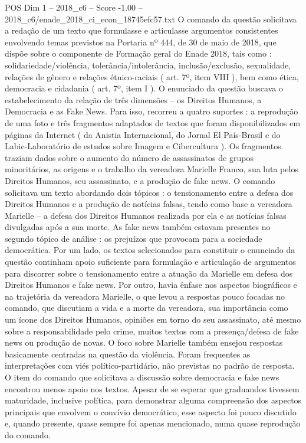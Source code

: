 \begin{textsample}{POS Dim 1 – 2018\_c6 – Score -1.00 – 2018\_c6/enade\_2018\_ci\_econ\_18745efc57.txt}
O comando da questão solicitava a redação de um texto que formulasse e articulasse argumentos consistentes envolvendo temas previstos na Portaria nº 444, de 30 de maio de 2018, que dispõe sobre o componente de Formação geral do Enade 2018, tais como : solidariedade/violência, tolerância/intolerância, inclusão/exclusão, sexualidade, relações de gênero e relações étnico-raciais ( art. 7º, item VIII ), bem como ética, democracia e cidadania ( art. 7º, item I ).
O enunciado da questão buscava o estabelecimento da relação de três dimensões – os Direitos Humanos, a Democracia e as Fake News.
Para isso, recorreu a quatro suportes : a reprodução de uma foto e três fragmentos adaptados de textos que foram disponibilizados em páginas da Internet ( da Anistia Internacional, do Jornal El País-Brasil e do Labic-Laboratório de estudos sobre Imagem e Cibercultura ).
Os fragmentos traziam dados sobre o aumento do número de assassinatos de grupos minoritários, as origens e o trabalho da vereadora Marielle Franco, sua luta pelos Direitos Humanos, seu assassinato, e a produção de fake news.
O comando solicitava um texto abordando dois tópicos : o tensionamento entre a defesa dos Direitos Humanos e a produção de notícias falsas, tendo como base a vereadora Marielle – a defesa dos Direitos Humanos realizada por ela e as notícias falsas divulgadas após a sua morte.
As fake news também estavam presentes no segundo tópico de análise : os prejuízos que provocam para a sociedade democrática.
Por um lado, os textos selecionados para constituir o enunciado da questão continham apoio suficiente para formulação e articulação de argumentos para discorrer sobre o tensionamento entre a atuação da Marielle em defesa dos Direitos Humanos e fake news.
Por outro, havia ênfase nos aspectos biográficos e na trajetória da vereadora Marielle, o que levou a respostas pouco focadas no comando, que discutiam a vida e a morte da vereadora, sua importância como um ícone dos Direitos Humanos, opiniões em torno do seu assassinato, até mesmo sobre a responsabilidade pelo crime, muitos textos com a presença/defesa de fake news ou produção de novas.
O foco sobre Marielle também ensejou respostas basicamente centradas na questão da violência.
Foram frequentes as interpretações com viés político-partidário, não previstas no padrão de resposta.
O item do comando que solicitava a discussão sobre democracia e fake news encontrou menos apoio nos textos.
Apesar de se esperar que graduandos tivessem maturidade, inclusive política, para demonstrar alguma compreensão dos aspectos principais que envolvem o convívio democrático, esse aspecto foi pouco discutido e, quando presente, quase sempre foi apenas mencionado, numa quase reprodução do comando.

\end{textsample}
